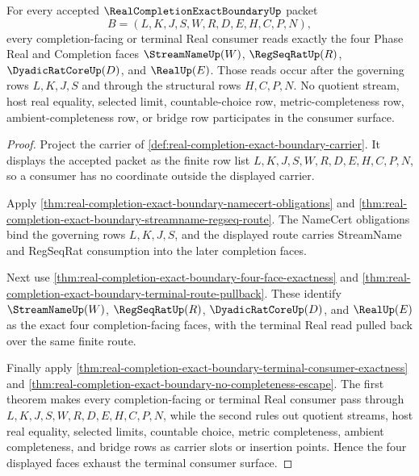 \begin{theorem}
\label{thm:real-completion-exact-boundary-four-face-terminal-consumer-exhaustion}
For every accepted $\RealCompletionExactBoundaryUp$ packet
$$
B=(L,K,J,S,W,R,D,E,H,C,P,N),
$$
every completion-facing or terminal Real consumer reads exactly the four Phase
Real and Completion faces $\StreamNameUp(W)$, $\RegSeqRatUp(R)$,
$\DyadicRatCoreUp(D)$, and $\RealUp(E)$. Those reads occur after the governing
rows $L,K,J,S$ and through the structural rows $H,C,P,N$. No quotient stream,
host real equality, selected limit, countable-choice row, metric-completeness
row, ambient-completeness row, or bridge row participates in the consumer
surface.
\end{theorem}
\begin{proof}
Project the carrier of \autoref{def:real-completion-exact-boundary-carrier}.
It displays the accepted packet as the finite row list
$L,K,J,S,W,R,D,E,H,C,P,N$, so a consumer has no coordinate outside the
displayed carrier.

Apply
\autoref{thm:real-completion-exact-boundary-namecert-obligations} and
\autoref{thm:real-completion-exact-boundary-streamname-regseq-route}. The
NameCert obligations bind the governing rows $L,K,J,S$, and the displayed
route carries StreamName and RegSeqRat consumption into the later completion
faces.

Next use \autoref{thm:real-completion-exact-boundary-four-face-exactness} and
\autoref{thm:real-completion-exact-boundary-terminal-route-pullback}. These
identify $\StreamNameUp(W)$, $\RegSeqRatUp(R)$, $\DyadicRatCoreUp(D)$, and
$\RealUp(E)$ as the exact four completion-facing faces, with the terminal Real
read pulled back over the same finite route.

Finally apply
\autoref{thm:real-completion-exact-boundary-terminal-consumer-exactness} and
\autoref{thm:real-completion-exact-boundary-no-completeness-escape}. The first
theorem makes every completion-facing or terminal Real consumer pass through
$L,K,J,S,W,R,D,E,H,C,P,N$, while the second rules out quotient streams, host
real equality, selected limits, countable choice, metric completeness, ambient
completeness, and bridge rows as carrier slots or insertion points. Hence the
four displayed faces exhaust the terminal consumer surface.
\end{proof}

